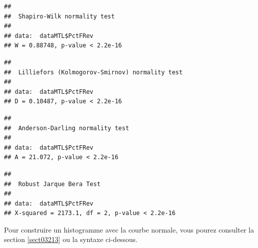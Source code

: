 \documentclass[
  11pt,
  french,
]{book}
\makeatletter
\newenvironment{Shaded}{\begin{snugshade}}{\end{snugshade}}
\newcommand{\KeywordTok}[1]{\textcolor[rgb]{0.13,0.29,0.53}{\textbf{#1}}}
\newcommand{\NormalTok}[1]{#1}
\newcommand{\OperatorTok}[1]{\textcolor[rgb]{0.81,0.36,0.00}{\textbf{#1}}}
\newenvironment{kframe}{%
\medskip{}
\setlength{\fboxsep}{.8em}
 \def\at@end@of@kframe{}%
 \ifinner\ifhmode%
  \def\at@end@of@kframe{\end{minipage}}%
  \begin{minipage}{\columnwidth}%
 \fi\fi%
 \def\FrameCommand##1{\hskip\@totalleftmargin \hskip-\fboxsep
 \colorbox{shadecolor}{##1}\hskip-\fboxsep
     \hskip-\linewidth \hskip-\@totalleftmargin \hskip\columnwidth}%
 \MakeFramed {\advance\hsize-\width
   \@totalleftmargin\z@ \linewidth\hsize
   \@setminipage}}%
 {\par\unskip\endMakeFramed%
 \at@end@of@kframe}
\renewenvironment{Shaded}{\begin{kframe}}{\end{kframe}}
\makeatother
\begin{document}
\begin{Shaded}
\end{Shaded}

\begin{verbatim}
## 
## 	Shapiro-Wilk normality test
## 
## data:  dataMTL$PctFRev
## W = 0.88748, p-value < 2.2e-16
\end{verbatim}

\begin{Shaded}
\end{Shaded}

\begin{verbatim}
## 
## 	Lilliefors (Kolmogorov-Smirnov) normality test
## 
## data:  dataMTL$PctFRev
## D = 0.10487, p-value < 2.2e-16
\end{verbatim}

\begin{Shaded}
\end{Shaded}

\begin{verbatim}
## 
## 	Anderson-Darling normality test
## 
## data:  dataMTL$PctFRev
## A = 21.072, p-value < 2.2e-16
\end{verbatim}

\begin{Shaded}
\end{Shaded}

\begin{verbatim}
## 
## 	Robust Jarque Bera Test
## 
## data:  dataMTL$PctFRev
## X-squared = 2173.1, df = 2, p-value < 2.2e-16
\end{verbatim}

Pour construire un histogramme avec la courbe normale, vous pourez consulter la section \ref{sect03213} ou la syntaxe ci-dessous.
\end{document}
